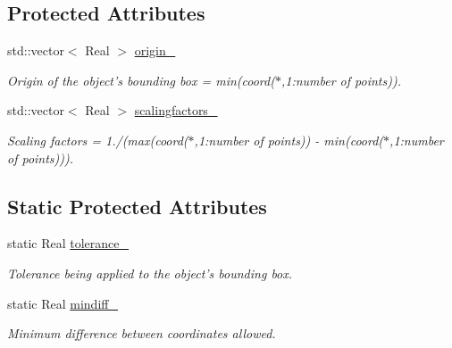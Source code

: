 \subsection*{Protected Attributes}
\begin{DoxyCompactItemize}
\item 
\hypertarget{classDomain_ab91b5378794983ad5d0b53fe60558d6f}{
std::vector$<$ Real $>$ \hyperlink{classDomain_ab91b5378794983ad5d0b53fe60558d6f}{origin\_\-}}
\label{classDomain_ab91b5378794983ad5d0b53fe60558d6f}

\begin{DoxyCompactList}\small\item\em Origin of the object's bounding box = min(coord($\ast$,1:number of points)). \item\end{DoxyCompactList}\item 
\hypertarget{classDomain_a413aed899edbdf8bca3a7b658ae284e2}{
std::vector$<$ Real $>$ \hyperlink{classDomain_a413aed899edbdf8bca3a7b658ae284e2}{scalingfactors\_\-}}
\label{classDomain_a413aed899edbdf8bca3a7b658ae284e2}

\begin{DoxyCompactList}\small\item\em Scaling factors = 1./(max(coord($\ast$,1:number of points)) -\/ min(coord($\ast$,1:number of points))). \item\end{DoxyCompactList}\end{DoxyCompactItemize}
\subsection*{Static Protected Attributes}
\begin{DoxyCompactItemize}
\item 
\hypertarget{classDomain_ac6e73bc09e5bd38075126e302d80f189}{
static Real \hyperlink{classDomain_ac6e73bc09e5bd38075126e302d80f189}{tolerance\_\-}}
\label{classDomain_ac6e73bc09e5bd38075126e302d80f189}

\begin{DoxyCompactList}\small\item\em Tolerance being applied to the object's bounding box. \item\end{DoxyCompactList}\item 
\hypertarget{classDomain_aade1fb6e3617f19dc15ae5cbe93fa74d}{
static Real \hyperlink{classDomain_aade1fb6e3617f19dc15ae5cbe93fa74d}{mindiff\_\-}}
\label{classDomain_aade1fb6e3617f19dc15ae5cbe93fa74d}

\begin{DoxyCompactList}\small\item\em Minimum difference between coordinates allowed. \item\end{DoxyCompactList}\end{DoxyCompactItemize}
